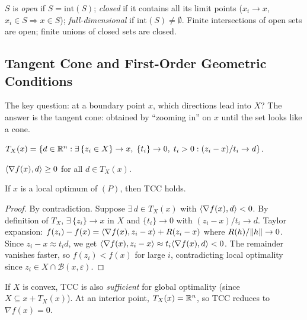 \begin{definition}\label{def:set-classes}
	$S$ is \emph{open} if $S = \mathrm{int}(S)$; \emph{closed} if it contains all its limit points ($x_i \to x$, $x_i \in S \Rightarrow x \in S$); \emph{full-dimensional} if $\mathrm{int}(S) \neq \emptyset$.
	Finite intersections of open sets are open; finite unions of closed sets are closed.
\end{definition}


\subsection{Tangent Cone and First-Order Geometric Conditions}\label{sec:tangent-cone}

The key question: at a boundary point $x$, which directions lead into $X$?
The answer is the tangent cone: obtained by ``zooming in'' on $x$ until the set looks like a cone.

\begin{definition}\label{def:tangent-cone}
	$T_X(x) = \{d \in \mathbb{R}^n : \exists\, \{z_i \in X\} \to x,\; \{t_i\} \to 0,\; t_i > 0 : (z_i - x)/t_i \to d\}$.
\end{definition}

\begin{definition}\label{def:tcc}
	$\langle\nabla f(x), d\rangle \geq 0$ for all $d \in T_X(x)$.
\end{definition}

\begin{theorem}\label{thm:tcc-necessary}
	If $x$ is a local optimum of $(P)$, then TCC holds.
\end{theorem}
\begin{proof}
	By contradiction.
	Suppose $\exists\, d \in T_X(x)$ with $\langle\nabla f(x), d\rangle < 0$.
	By definition of $T_X$, $\exists\, \{z_i\} \to x$ in $X$ and $\{t_i\} \to 0$ with $(z_i - x)/t_i \to d$.
	Taylor expansion: $f(z_i) - f(x) = \langle\nabla f(x), z_i - x\rangle + R(z_i - x)$ where $R(h)/\lVert h\rVert \to 0$.
	Since $z_i - x \approx t_i d$, we get $\langle\nabla f(x), z_i - x\rangle \approx t_i \langle\nabla f(x), d\rangle < 0$.
	The remainder vanishes faster, so $f(z_i) < f(x)$ for large $i$, contradicting local optimality since $z_i \in X \cap \mathcal{B}(x, \varepsilon)$.
\end{proof}

If $X$ is convex, TCC is also \emph{sufficient} for global optimality (since $X \subseteq x + T_X(x)$).
At an interior point, $T_X(x) = \mathbb{R}^n$, so TCC reduces to $\nabla f(x) = 0$.

